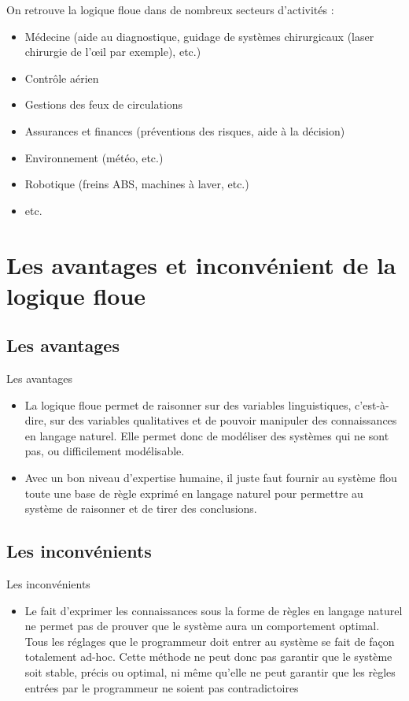 \documentclass[aspectratio=169,professionalfonts, 12pt]{beamer}
\begin{document}
\begin{frame}
  On retrouve la logique floue dans de nombreux secteurs d'activités :
  \begin{itemize}
    \item Médecine (aide au diagnostique, guidage de systèmes chirurgicaux (laser chirurgie de l’œil par exemple), etc.)
    \item Contrôle aérien
    \item Gestions des feux de circulations
    \item Assurances et finances (préventions des risques, aide à la décision)
    \item Environnement (météo, etc.)
    \item Robotique (freins ABS, machines à laver, etc.)
    \item etc.
  \end{itemize}
\end{frame}
\section{Les avantages et inconvénient de la logique floue}
\subsection{Les avantages}
\begin{frame}{Les avantages}
  \begin{itemize}
    \item La logique floue permet de raisonner sur des variables linguistiques, c'est-à-dire, sur des variables qualitatives et de pouvoir manipuler des connaissances en langage naturel. Elle permet donc de modéliser des systèmes qui ne sont pas, ou difficilement modélisable.
    \item Avec un bon niveau d’expertise humaine, il juste faut fournir au système flou toute une base de règle exprimé en langage naturel pour permettre au système de raisonner et de tirer des conclusions.  
  \end{itemize}
\end{frame}
\subsection{Les inconvénients}
\begin{frame}{Les inconvénients}
  \begin{itemize}
    \item Le fait d'exprimer les connaissances sous la forme de règles en langage naturel ne permet pas de prouver
    que le système aura un comportement optimal. Tous les réglages que le programmeur doit entrer au système se fait
    de façon totalement ad-hoc. Cette méthode ne peut donc pas garantir que le système soit stable, précis ou optimal,
    ni même qu'elle ne peut garantir que les règles entrées par le programmeur ne soient pas contradictoires
  \end{itemize}
\end{frame}
\end{document}
